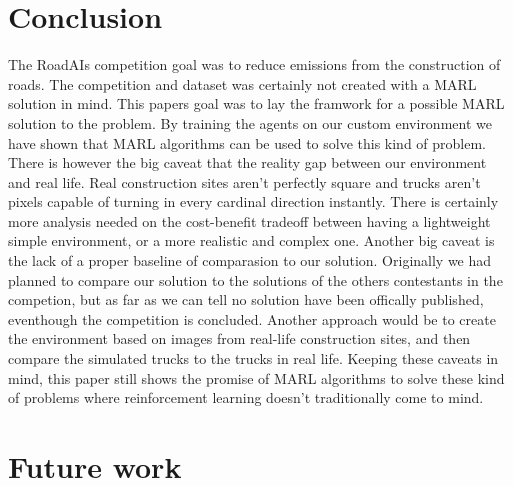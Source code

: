 \documentclass[conference]{IEEEtran}
\begin{document}
\section{Conclusion}

The RoadAIs competition goal was to reduce \coo{} emissions from the construction of roads.
The competition and dataset was certainly not created with a MARL solution in mind.
This papers goal was to lay the framwork for a possible MARL solution to the problem.
By training the agents on our custom environment we have shown that MARL algorithms can be used to solve this  kind of problem.
There is however the big caveat that the reality gap between our environment and real life.
Real construction sites aren't perfectly square and trucks aren't pixels capable of turning in every cardinal direction instantly. There is certainly more analysis needed on the cost-benefit tradeoff between having a lightweight simple environment, or a more realistic and complex one.
Another big caveat is the lack of a proper baseline of comparasion to our solution.
Originally we had planned to compare our solution to the solutions of the others contestants in the competion, but as far as we can tell no solution have been offically published, eventhough the competition is concluded.
Another approach would be to create the environment based on images from real-life construction sites, and then
compare the simulated trucks to the trucks in real life.
Keeping these caveats in mind, this paper still shows the promise of MARL algorithms to solve these kind of
problems where reinforcement learning doesn't traditionally come to mind.



\section{Future work}
\end{document}
